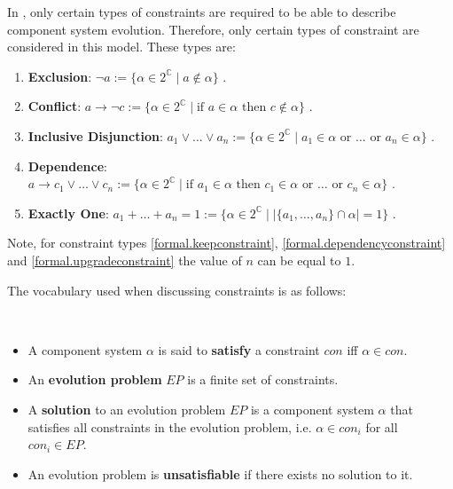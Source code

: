In \modelname, only certain types of constraints are required to be able to describe component system evolution.
Therefore, only certain types of constraint are considered in this model.
These types are:
\begin{enumerate}
  \label{formal.constrainttypes}
  \item \textbf{Exclusion}: $\neg a := \{\alpha \in 2^{\mathbb{C}} \mid a \not \in \alpha \}$ \label{formal.removeconstraint}.
  \item \textbf{Conflict}: $a \rightarrow \neg c := \{\alpha \in 2^{\mathbb{C}} \mid \mbox{if } a \in \alpha \mbox{ then } c \not \in \alpha\}$ \label{formal.conflictconstraint}.
  \item \textbf{Inclusive Disjunction}: $a_1 \vee \ldots \vee a_n := \{\alpha \in 2^{\mathbb{C}} \mid a_1 \in \alpha \mbox{ or }\ldots \mbox{ or } a_n \in \alpha\}$ \label{formal.keepconstraint}.
  \item \textbf{Dependence}: $a \rightarrow c_1 \vee \ldots \vee c_n := \{\alpha \in 2^{\mathbb{C}} \mid \mbox{if } a_1 \in \alpha \mbox{ then }  c_1 \in \alpha \mbox{ or } \ldots \mbox{ or } c_n \in \alpha\}$ \label{formal.dependencyconstraint}.
  \item \textbf{Exactly One}: $a_1 + \ldots + a_n = 1 := \{\alpha \in 2^{\mathbb{C}} \mid |\{a_1,\ldots,a_n\} \cap \alpha| = 1\}$ \label{formal.upgradeconstraint}.
\end{enumerate}
Note, for constraint types \ref{formal.keepconstraint}, \ref{formal.dependencyconstraint} and \ref{formal.upgradeconstraint} the value of $n$ can be equal to $1$.

The vocabulary used when discussing constraints is as follows:
\begin{defs}
\label{formal.constraintdefs}
{\ }
\begin{itemize}
  \item A component system $\alpha$ is said to \textbf{satisfy} a constraint $con$ iff $\alpha \in con$.
  \item An \textbf{evolution problem} $EP$ is a finite set of constraints.
  \item A \textbf{solution} to an evolution problem $EP$ is a component system  $\alpha$  that satisfies all constraints in the evolution problem, i.e. $\alpha \in con_i$ for all $con_i \in EP$.
  \item An evolution problem is \textbf{unsatisfiable} if there exists no solution to it.  
\end{itemize}
\end{defs}

